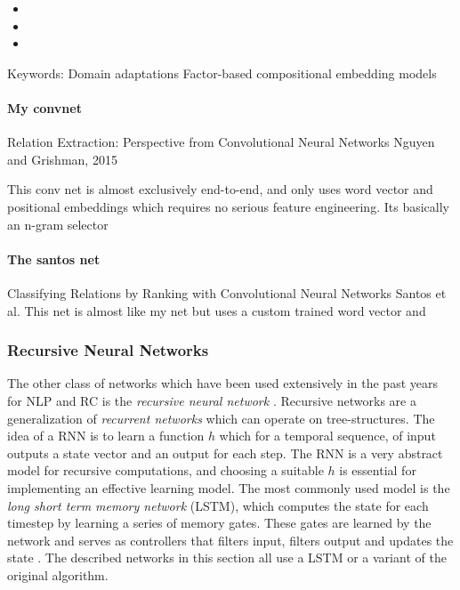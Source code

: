 \begin{itemize}

\item   

\item

\item


\end{itemize}

Keywords: 
Domain adaptations
Factor-based compositional embedding
models


\paragraph{My convnet}
Relation Extraction:
Perspective from Convolutional Neural Networks
Nguyen and Grishman, 2015

This conv net is almost exclusively end-to-end, and only uses word vector and positional 
embeddings which requires no serious feature engineering.
Its basically an n-gram selector

\paragraph{The santos net}
Classifying Relations by Ranking with Convolutional Neural Networks
Santos et al.
This net is almost like my net but uses a custom trained word vector and 

\subsubsection{Recursive Neural Networks}
\label{subsec:rnn}

The other class of networks which have been used extensively in the past years for NLP and RC is the \emph{recursive neural network} \citep{pollack1990}. Recursive networks are a generalization of \emph{recurrent networks} \citep{elman1990} which can operate on tree-structures. The idea of a RNN is to learn a function $h$ which for a temporal sequence, of input outputs a state vector and an output for each step. The RNN is a very abstract model for recursive computations, and choosing a suitable $h$ is essential for implementing an effective learning model. The most commonly used model is the \emph{long short term memory network} (LSTM), which computes the state for each timestep by learning a series of memory gates. These gates are learned by the network and serves as controllers that filters input, filters output and updates the state \citep{schmidhuber2003}. The described networks in this section all use a LSTM or a variant of the original algorithm.

